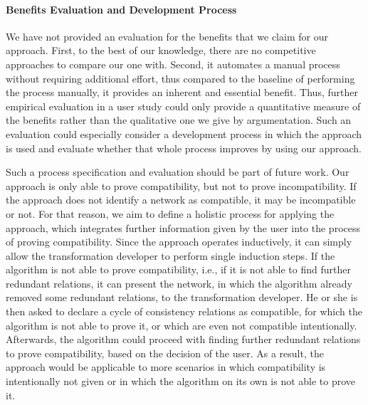 \paragraph{Benefits Evaluation and Development Process}
We have not provided an evaluation for the benefits that we claim for our approach.
First, to the best of our knowledge, there are no competitive approaches to compare our one with.
Second, it automates a manual process without requiring additional effort, thus compared to the baseline of performing the process manually, it provides an inherent and essential benefit.
Thus, further empirical evaluation in a user study could only provide a quantitative measure of the benefits rather than the qualitative one we give by argumentation.
Such an evaluation could especially consider a development process in which the approach is used and evaluate whether that whole process improves by using our approach.

Such a process specification and evaluation should be part of future work.
Our approach is only able to prove compatibility, but not to prove incompatibility. If the approach does not identify a network as compatible, it may be incompatible or not.
For that reason, we aim to define a holistic process for applying the approach, which integrates further information given by the user into the process of proving compatibility.
Since the approach operates inductively, it can simply allow the transformation developer to perform single induction steps.
If the algorithm is not able to prove compatibility, i.e., if it is not able to find further redundant relations, it can present the network, in which the algorithm already removed some redundant relations, to the transformation developer.
He or she is then asked to declare a cycle of consistency relations as compatible, for which the algorithm is not able to prove it, or which are even not compatible intentionally.
Afterwards, the algorithm could proceed with finding further redundant relations to prove compatibility, based on the decision of the user.
As a result, the approach would be applicable to more scenarios in which compatibility is intentionally not given or in which the algorithm on its own is not able to prove it.

